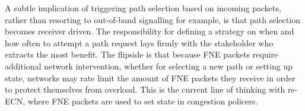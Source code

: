 A subtle implication of triggering path selection based on incoming packets, rather than resorting to out-of-band signalling for example, is that path selection becomes receiver driven. The responsibility for defining a strategy on when and how often to attempt a path request lays firmly with the stakeholder who extracts the most benefit. The flipside is that because \ac{FNE} packets require additional network intervention, whether for selecting a new path or setting up state, networks may rate limit the amount of \ac{FNE} packets they receive in order to protect themselves from overload. This is the current line of thinking with re-\ac{ECN}, where \ac{FNE} packets are used to set state in congestion policers.


